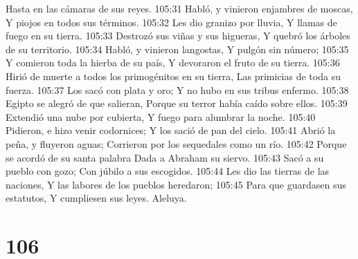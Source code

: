 Hasta en las cámaras de sus reyes. 
105:31 Habló, y vinieron enjambres de moscas, 
Y piojos en todos sus términos. 
105:32 Les dio granizo por lluvia, 
Y llamas de fuego en su tierra. 
105:33 Destrozó sus viñas y sus higueras, 
Y quebró los árboles de su territorio. 
105:34 Habló, y vinieron langostas, 
Y pulgón sin número; 
105:35 Y comieron toda la hierba de su país, 
Y devoraron el fruto de su tierra. 
105:36 Hirió de muerte a todos los primogénitos en su tierra, 
Las primicias de toda su fuerza. 
105:37 Los sacó con plata y oro; 
Y no hubo en sus tribus enfermo. 
105:38 Egipto se alegró de que salieran, 
Porque su terror había caído sobre ellos. 
105:39 Extendió una nube por cubierta, 
Y fuego para alumbrar la noche. 
105:40 Pidieron, e hizo venir codornices; 
Y los sació de pan del cielo. 
105:41 Abrió la peña, y fluyeron aguas; 
Corrieron por los sequedales como un río. 
105:42 Porque se acordó de su santa palabra 
Dada a Abraham su siervo. 
105:43 Sacó a su pueblo con gozo; 
Con júbilo a sus escogidos. 
105:44 Les dio las tierras de las naciones, 
Y las labores de los pueblos heredaron; 
105:45 Para que guardasen sus estatutos, 
Y cumpliesen sus leyes. 
Aleluya. 

\chapter{106}

